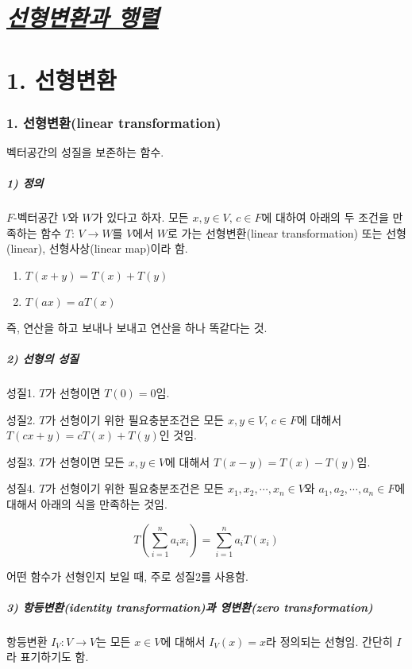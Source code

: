 \documentclass[10pt, a4paper]{article}
\begin{document}
\newpage

\part{\textit{\underline{선형변환과 행렬}}}
\part*{1. 선형변환}

\section*{1. 선형변환(linear transformation)}

벡터공간의 성질을 보존하는 함수.

\subsubsection*{1) 정의}
$F$-벡터공간 $V$와 $W$가 있다고 하자. 모든 $x,y \in V,\,c \in F$에 대하여 아래의 두 조건을 만족하는 함수 $T:\,V \rightarrow W$를 $V$에서 $W$로 가는 선형변환(linear transformation) 또는 선형(linear), 선형사상(linear map)이라 함.

\begin{enumerate}
\item $T(x+y)=T(x)+T(y)$
\item $T(ax)=aT(x)$
\end{enumerate}

즉, 연산을 하고 보내나 보내고 연산을 하나 똑같다는 것.

\subsubsection*{2) 선형의 성질}
성질1. $T$가 선형이면 $T(0)=0$임.

성질2. $T$가 선형이기 위한 필요충분조건은 모든 $x,y \in V$, $c \in F$에 대해서 $T(cx+y)=cT(x)+T(y)$인 것임.

성질3. $T$가 선형이면 모든 $x,y \in V$에 대해서 $T(x-y)=T(x)-T(y)$임.

성질4. $T$가 선형이기 위한 필요충분조건은 모든 $x_1,x_2, \cdots ,x_n \in V$와 $a_1,a_2, \cdots ,a_n \in F$에 대해서 아래의 식을 만족하는 것임.

\[
T(\sum_{i=1}^{n}{a_i x_i})=\sum_{i=1}^{n}{a_i T(x_i)}
\]

어떤 함수가 선형인지 보일 때, 주로 성질2를 사용함.

\subsubsection*{3) 항등변환(identity transformation)과 영변환(zero transformation)}
항등변환 $I_V : V \rightarrow V$는 모든 $x \in V$에 대해서 $I_V(x)=x$라 정의되는 선형임. 간단히 $I$라 표기하기도 함.
\end{document}
